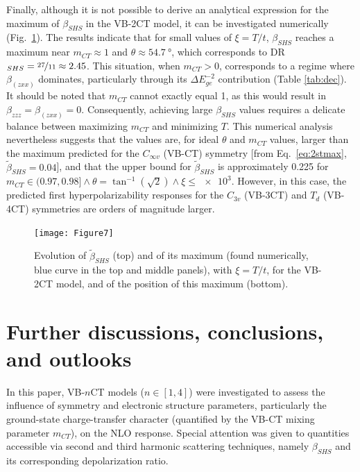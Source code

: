 \documentclass[journal=jpcafh]{achemso}
\begin{document}
Finally, although it is not possible to derive an analytical expression for the maximum of $\beta_{SHS}$ in the VB-2CT model\cite{yangLargeOffDiagonalContribution2003}, it can be investigated numerically (Fig.~\ref{fig:3stmax}). The results indicate that for small values of $\xi = T/t$, $\beta_{SHS}$ reaches a maximum near $m_{CT} \approx 1$ and $\theta \approx \SI{54.7}{\degree}$, which corresponds to DR$_{SHS}=\nicefrac{27}{11}\approx 2.45$. This situation, when $m_{CT} > 0$, corresponds to a regime where $\beta_{(zxx)}$ dominates, particularly through its $\Delta E_{ge}^{-2}$ contribution (Table \ref{tab:dec}). It should be noted that $m_{CT}$ cannot exactly equal 1, as this would result in $\beta_{zzz} = \beta_{(zxx)} = 0$. Consequently, achieving large $\beta_{SHS}$ values requires a delicate balance between maximizing $m_{CT}$ and minimizing $T$. This numerical analysis nevertheless suggests that the values are, for ideal $\theta$ and $m_{CT}$ values, larger than the maximum predicted for the $C_{\infty v}$ (VB-CT) symmetry [from Eq.~\eqref{eq:2stmax}, $\tilde\beta_{SHS}=0.04$], and that the upper bound for $\tilde\beta_{SHS}$ is approximately 0.225 for $m_{CT}\in(0.97,0.98]\land \theta = \tan^{-1}(\sqrt{2}) \land \xi \leq \num{e3}$. However, in this case, the predicted first hyperpolarizability responses for the $C_{3v}$ (VB-3CT) and $T_d$  (VB-4CT) symmetries are orders of magnitude larger.

\begin{figure}
	\centering
	\texttt{[image: Figure7]}
	\caption{Evolution of $\tilde\beta_{SHS}$ (top) and of its maximum (found numerically, blue curve in the top and middle panels), with $\xi = T/t$, for the VB-2CT model, and of the position of this maximum (bottom).}
	\label{fig:3stmax}
\end{figure}


\clearpage
\section{Further discussions, conclusions, and outlooks}

In this paper, VB-$n$CT models ($n \in [1,4]$) were investigated to assess the influence of symmetry and electronic structure parameters, particularly the ground-state charge-transfer character (quantified by the VB-CT mixing parameter $m_{CT}$), on the NLO response. Special attention was given to quantities accessible via second and third harmonic scattering techniques, namely $\beta_{SHS}$ and its corresponding depolarization ratio.
\end{document}
